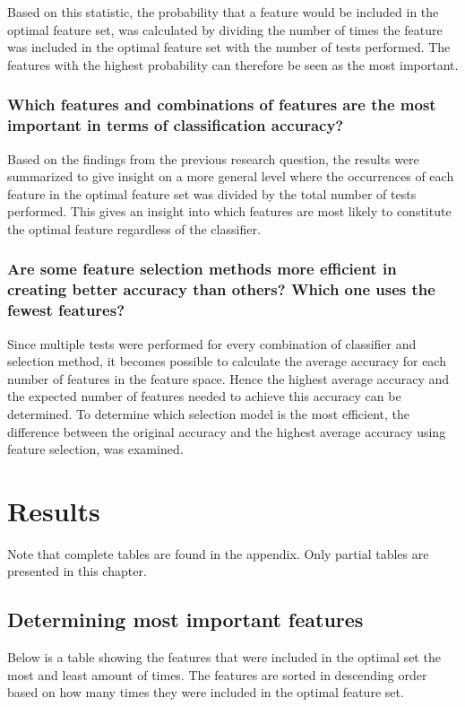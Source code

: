 \documentclass{kththesis}
\begin{document}
Based on this statistic, the probability that a feature would be included in the optimal feature set, was calculated by dividing the number of times the feature was included in the optimal feature set with the number of tests performed. The features with the highest probability can therefore be seen as the most important.

\subsection{Which features and combinations of features are the most important in terms of classification accuracy?}
Based on the findings from the previous research question, the results were summarized to give insight on a more general level where the occurrences of each feature in the optimal feature set was divided by the total number of tests performed. This gives an insight into which features are most likely to constitute the optimal feature regardless of the classifier.

\subsection{Are some feature selection methods more efficient in creating better accuracy than others? Which one uses the fewest features?}
Since multiple tests were performed for every combination of classifier and selection method, it becomes possible to calculate the average accuracy for each number of features in the feature space. Hence the highest average accuracy and the expected number of features needed to achieve this accuracy can be determined. To determine which selection model is the most efficient, the difference between the original accuracy and the highest average accuracy using feature selection, was examined.


\chapter{Results}

Note that complete tables are found in the appendix. Only partial tables are presented in this chapter.

\section{Determining most important features}

Below is a table showing the features that were included in the optimal set the most and least amount of times. The features are sorted in descending order based on how many times they were included in the optimal feature set.
\end{document}
